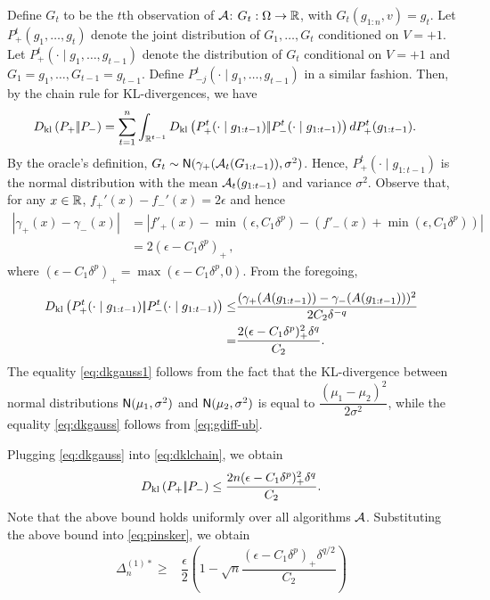 Define $G_t$ to be the $t$th observation of $\mathcal{A}$: $G_t:\Omega \to \mathbb{R}$, with $G_t( g_{1:n}, v) = g_t$.
Let $P_+^t(g_1,\dots,g_t)$ denote the joint distribution of $G_1,\dots,G_t$ conditioned on $V=+1$.
Let $P_{+}^t(\cdot\mid g_1,\ldots,g_{t-1})$ denote the distribution of $G_t$ conditional on $V=+1$ and $G_1=g_1,\ldots,G_{t-1}=g_{t-1}$. Define  $P_{-j}^t(\cdot\mid g_1,\ldots,g_{t-1})$ in a similar fashion.
Then, by the chain rule for KL-divergences, we have
\begin{align}
\label{eq:dklchain}
&D_{\rm kl}\left({P_{+}} |\!| {P_{-}} \right)= \sum_{t=1}^n \int_{\mathbb{R}^{t-1}} D_{\rm kl}\left({P_{+}^t(\cdot\mid g_{1:t-1})} |\!| {P_{-}^t(\cdot\mid g_{1:t-1})} \right) d P_{+}^t( g_{1:t-1}).\nonumber
\end{align}
By the oracle's definition, $G_t \sim  \mathsf{N}(\gamma_{+}(\mathcal{A}_t(G_{1:t-1})),\sigma^2)$. Hence, 
$P_{+}^t(\cdot\mid g_{1:t-1})$ is the normal distribution with the mean $\mathcal{A}_t(g_{1:t-1})$ and variance $\sigma^2$.
Observe that, for any $x\in \mathbb{R}$, $f_+'(x) - f_-'(x) = 2\epsilon$ and hence
\begin{align}
 |\gamma_+(x) - \gamma_-(x)| 
& = | f'_+(x) - \min(\epsilon,C_1 \delta^p) - (f'_-(x)+\min(\epsilon,C_1 \delta^p)) | \nonumber \\
& = 2 (\epsilon - C_1 \delta^p)_+\,,
 \label{eq:gdiff-ub}
\end{align}
where $(\epsilon - C_1 \delta^p)_+ = \max(\epsilon - C_1 \delta^p,0)$. 
From the foregoing, 
\begin{align}
D_{\rm kl}\left({P_{+}^t(\cdot\mid g_{1:t-1})} |\!| {P_{-}^t(\cdot\mid g_{1:t-1})} \right)\le&\dfrac{(\gamma_{+}(A(g_{1:t-1})) - \gamma_{-}(A(g_{1:t-1})))^2}{2 C_2\delta^{-q}}\label{eq:dkgauss1}\\
 =& \dfrac{2(\epsilon-C_1\delta^p)_+^2\delta^q}{C_2}.\label{eq:dkgauss}
\end{align}
The equality \eqref{eq:dkgauss1} follows from the fact that the KL-divergence between normal distributions $\mathsf{N}(\mu_1,\sigma^2)$ and $\mathsf{N}(\mu_2,\sigma^2)$ is equal to $\dfrac{(\mu_1 - \mu_2)^2}{2 \sigma^2}$, while the equality \eqref{eq:dkgauss} follows from \eqref{eq:gdiff-ub}.

Plugging \eqref{eq:dkgauss} into \eqref{eq:dklchain}, we obtain
\begin{align}
D_{\rm kl}\left({P_{+}} |\!| {P_{-}} \right) \le \dfrac{2n(\epsilon-C_1\delta^p)_+^2 \delta^q}{C_2}.\label{eq:dkbd}
\end{align}
Note that the above bound holds uniformly over all algorithms $\mathcal{A}$. 
Substituting the above bound into \eqref{eq:pinsker}, we obtain 
\begin{align}
 \Delta_n^{(1)*}
  \ge & \dfrac{\epsilon}{2} \left(1 - \sqrt{
    n}  \dfrac{(\epsilon-C_1\delta^p)_+\delta^{q/2}}{C_2}
  \right)\label{eq:final-lower-bd}
\end{align}

